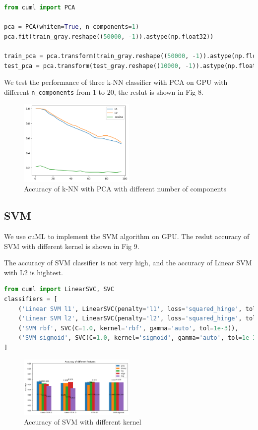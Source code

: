 \documentclass[11pt]{article}
\begin{document}
\begin{lstlisting}[language=Python, caption={PCA}]
from cuml import PCA

pca = PCA(whiten=True, n_components=1)
pca.fit(train_gray.reshape((50000, -1)).astype(np.float32))
  
train_pca = pca.transform(train_gray.reshape((50000, -1)).astype(np.float32))
test_pca = pca.transform(test_gray.reshape((10000, -1)).astype(np.float32))
\end{lstlisting}

We test the performance of three k-NN classifier with PCA on GPU with different \verb|n_components| from $1$ to $20$, the reslut is shown in Fig 8.
\begin{figure}
    \centering
    \includegraphics[width=0.5\textwidth]{pca.png}
    \caption{Accuracy of k-NN with PCA with different number of components}
    \label{fig:pca}
\end{figure}

\subsection{SVM}

We use cuML to implement the SVM algorithm on GPU. The reslut accuracy of SVM with different kernel is shown in Fig 9.

The accuracy of SVM classifier is not very high, and the accuracy of Linear SVM with L2 is hightest.
\begin{lstlisting}[language=Python, caption={SVM}]
from cuml import LinearSVC, SVC
classifiers = [
    ('Linear SVM l1', LinearSVC(penalty='l1', loss='squared_hinge', tol=1e-4, C=1.0)),
    ('Linear SVM l2', LinearSVC(penalty='l2', loss='squared_hinge', tol=1e-4, C=1.0)),
    ('SVM rbf', SVC(C=1.0, kernel='rbf', gamma='auto', tol=1e-3)),
    ('SVM sigmoid', SVC(C=1.0, kernel='sigmoid', gamma='auto', tol=1e-3)),
]
\end{lstlisting}
\begin{figure}
    \centering
    \includegraphics[width=0.5\textwidth]{svm.png}
    \caption{Accuracy of SVM with different kernel}
    \label{fig:svm}
\end{figure}
\end{document}
